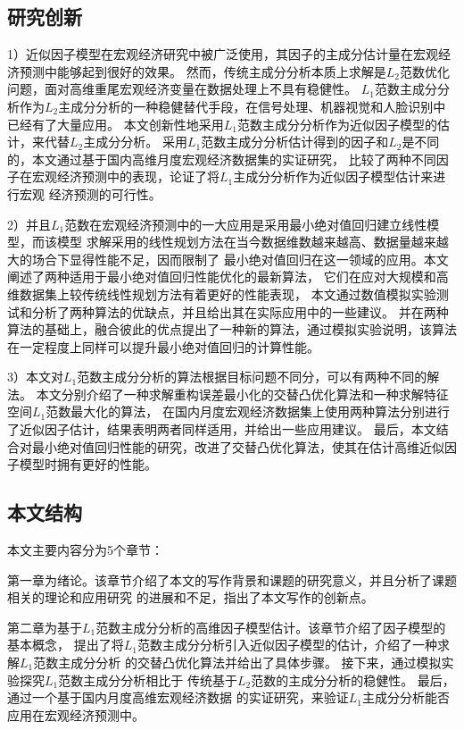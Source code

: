 \subsection{研究创新}

1）近似因子模型在宏观经济研究中被广泛使用，其因子的主成分估计量在宏观经济预测中能够起到很好的效果。
然而，传统主成分分析本质上求解是$L_2$范数优化问题，面对高维重尾宏观经济变量在数据处理上不具有稳健性。
$L_1$范数主成分分析作为$L_2$主成分分析的一种稳健替代手段，在信号处理、机器视觉和人脸识别中
已经有了大量应用。
本文创新性地采用$L_1$范数主成分分析作为近似因子模型的估计，来代替$L_2$主成分分析。
采用$L_1$范数主成分分析估计得到的因子和$L_2$是不同的，本文通过基于国内高维月度宏观经济数据集的实证研究，
比较了两种不同因子在宏观经济预测中的表现，论证了将$L_1$主成分分析作为近似因子模型估计来进行宏观
经济预测的可行性。

2）并且$L_1$范数在宏观经济预测中的一大应用是采用最小绝对值回归建立线性模型，而该模型
求解采用的线性规划方法在当今数据维数越来越高、数据量越来越大的场合下显得性能不足，因而限制了
最小绝对值回归在这一领域的应用。本文阐述了两种适用于最小绝对值回归性能优化的最新算法，
它们在应对大规模和高维数据集上较传统线性规划方法有着更好的性能表现，
本文通过数值模拟实验测试和分析了两种算法的优缺点，并且给出其在实际应用中的一些建议。
并在两种算法的基础上，融合彼此的优点提出了一种新的算法，通过模拟实验说明，该算法
在一定程度上同样可以提升最小绝对值回归的计算性能。

3）本文对$L_1$范数主成分分析的算法根据目标问题不同分，可以有两种不同的解法。
本文分别介绍了一种求解重构误差最小化的交替凸优化算法和一种求解特征空间$L_1$范数最大化的算法，
在国内月度宏观经济数据集上使用两种算法分别进行了近似因子估计，结果表明两者同样适用，并给出一些应用建议。
最后，本文结合对最小绝对值回归性能的研究，改进了交替凸优化算法，使其在估计高维近似因子模型时拥有更好的性能。

\subsection{本文结构}

本文主要内容分为5个章节：

第一章为绪论。该章节介绍了本文的写作背景和课题的研究意义，并且分析了课题相关的理论和应用研究
的进展和不足，指出了本文写作的创新点。

第二章为基于$L_1$范数主成分分析的高维因子模型估计。该章节介绍了因子模型的基本概念，
提出了将$L_1$范数主成分分析引入近似因子模型的估计，介绍了一种求解$L_1$范数主成分分析
的交替凸优化算法并给出了具体步骤。
接下来，通过模拟实验探究$L_1$范数主成分分析相比于
传统基于$L_2$范数的主成分分析的稳健性。
最后，通过一个基于国内月度高维宏观经济数据
的实证研究，来验证$L_1$主成分分析能否应用在宏观经济预测中。

